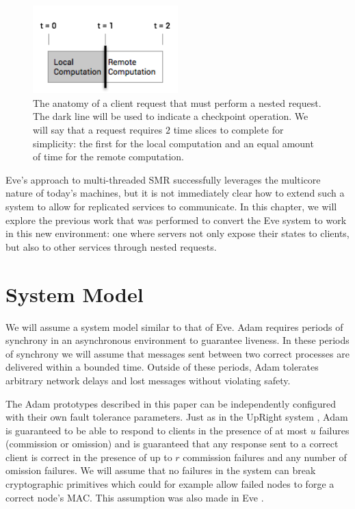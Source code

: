 \documentclass[11pt, oneside]{report}
\begin{document}
\begin{figure}[h]
\centering
\includegraphics[width=0.5\textwidth]{RequestAnatomy.png}
\caption{\label{anatomy}The anatomy of a client request that must perform a nested request. The dark line will be used to indicate a checkpoint operation. We will say that a request requires $2$ time slices to complete for simplicity: the first for the local computation and an equal amount of time for the remote computation.}
\end{figure}

Eve's approach to multi-threaded SMR successfully leverages the multicore nature of today's machines, but it is not immediately clear how to extend such a system to allow for replicated services to communicate. 
In this chapter, we will explore the previous work that was performed to convert the Eve system to work in this new environment: one where servers not only expose their states to clients, but also to other services through nested requests.

\section{System Model}
We will assume a system model similar to that of Eve. 
Adam requires periods of synchrony in an asynchronous environment to guarantee liveness. 
In these periods of synchrony we will assume that messages sent between two correct processes are delivered within a bounded time. 
Outside of these periods, Adam tolerates arbitrary network delays and lost messages without violating safety.

The Adam prototypes described in this paper can be independently configured with their own fault tolerance parameters. 
Just as in the UpRight system \cite{upRight}, Adam is guaranteed to be able to respond to clients in the presence of at most $u$ failures (commission or omission) and is guaranteed that any response sent to a correct client is correct in the presence of up to $r$ commission failures and any number of omission failures. 
We will assume that no failures in the system can break cryptographic primitives which could for example allow failed nodes to forge a correct node's MAC. This assumption was also made in Eve \cite{eve, manosThesis}.
\end{document}
